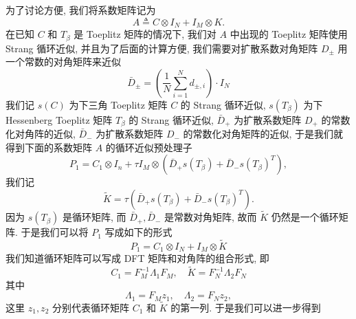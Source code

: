 \documentclass{ecnumaster}
\begin{document}
为了讨论方便, 我们将系数矩阵记为
\begin{equation}\label{eq:A}
  A \triangleq C \otimes I_N + I_M \otimes K.
\end{equation}
在已知 $C$ 和 $T_{\beta}$ 是 Toeplitz 矩阵的情况下,
我们对 $A$ 中出现的 Toeplitz 矩阵使用 Strang 循环近似,
并且为了后面的计算方便,
我们需要对扩散系数对角矩阵 $D_{\pm}$ 用一个常数的对角矩阵来近似
\begin{equation}\label{eq:Dpm-bar}
  \bar{D}_{\pm} = \left(\frac{1}{N} \sum_{i=1}^{N} d_{\pm,i}\right) \cdot I_N
\end{equation}
我们记 $s(C)$ 为下三角 Toeplitz 矩阵 $C$ 的 Strang 循环近似,
$s(T_{\beta})$ 为下 Hessenberg Toeplitz 矩阵 $T_{\beta}$ 的 Strang 循环近似,
$\bar{D}_+$ 为扩散系数矩阵 $D_+$ 的常数化对角阵的近似,
$\bar{D}_-$ 为扩散系数矩阵 $D_-$ 的常数化对角矩阵的近似,
于是我们就得到下面的系数矩阵 $A$ 的循环近似预处理子
\begin{equation}
  P_1 = C_1 \otimes I_n
  + \tau I_M \otimes (\bar{D}_+ s(T_{\beta}) + \bar{D}_- s(T_{\beta})^T),
\end{equation}
我们记
$$
  \tilde{K} = \tau (\bar{D}_+ s(T_{\beta}) + \bar{D}_- s(T_{\beta})^T).
$$
因为 $s(T_{\beta})$ 是循环矩阵,
而 $\bar{D}_+, \bar{D}_-$ 是常数对角矩阵, 故而 $\tilde{K}$ 仍然是一个循环矩阵.
于是我们可以将 $P_1$ 写成如下的形式
\begin{equation}\label{eq:P1}
    P_1 = C_1 \otimes I_N + I_M \otimes \tilde{K}
\end{equation}
我们知道循环矩阵可以写成 DFT 矩阵和对角阵的组合形式, 即
$$
  C_1 = F_M^{-1}\Lambda _1F_M, \quad \tilde{K} = F_N^{-1}\Lambda _2F_N
$$
其中
$$
  \Lambda _1 = F_Mz_1, \quad \Lambda_2 = F_Nz_2,
$$
这里 $z_1, z_2$ 分别代表循环矩阵 $C_1$ 和 $\tilde{K}$ 的第一列.
于是我们可以进一步得到
\end{document}
